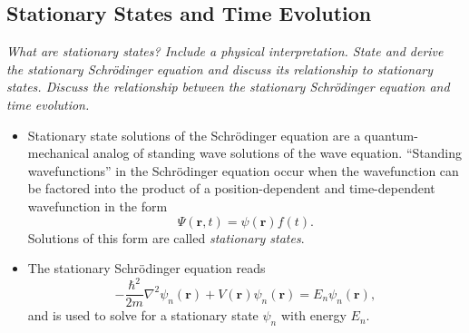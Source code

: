 \documentclass[11pt, a4paper]{article}
\renewcommand{\laplacian}{\nabla^{2}}
\newcommand{\Schro}{Schr\"{o}dinger\xspace}
\renewcommand{\vec}[1]{\bm{#1}}  %
\renewcommand{\r}{\vec{r}}  %
\newcommand{\p}{\psi}  %
\renewcommand{\P}{\Psi}  %
\begin{document}
\subsection{Stationary States and Time Evolution}
\textit{What are stationary states? Include a  physical interpretation. State and derive the stationary \Schro equation and discuss its relationship to stationary states. Discuss the relationship between the stationary \Schro equation and time evolution.}
\begin{itemize}
	\item Stationary state solutions of the \Schro equation are a quantum-mechanical analog of standing wave solutions of the wave equation. ``Standing wavefunctions'' in the \Schro equation occur when the wavefunction can be factored into the product of a position-dependent and time-dependent wavefunction in the form
	\begin{equation*}
		\P(\r, t) = \p(\r)f(t).
	\end{equation*}
    Solutions of this form are called \textit{stationary states}. 
	
	\item The stationary \Schro equation reads
    \begin{equation*}
        - \frac{\hbar^{2}}{2m} \laplacian \psi_{n}(\r) + V(\r) \psi_{n}(\r) = E_{n} \psi_{n}(\r),
    \end{equation*}
    and is used to solve for a stationary state $ \psi_{n} $ with energy $ E_{n} $. 
\end{itemize}
\end{document}
